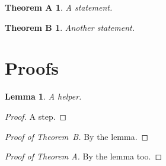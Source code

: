 \documentclass{article}
\newtheorem*{thmA}{Theorem A}
\newtheorem*{thmB}{Theorem B}
\newtheorem{lemma}{Lemma}
\begin{document}
\begin{thmA}
A statement.
\end{thmA}
\begin{thmB}
Another statement.
\end{thmB}
\section{Proofs}
\begin{lemma}
A helper.
\end{lemma}
\begin{proof}
A step.
\end{proof}
\begin{proof}[Proof of Theorem~B]
By the lemma.
\end{proof}
\begin{proof}[Proof of Theorem A]
By the lemma too.
\end{proof}
\end{document}
